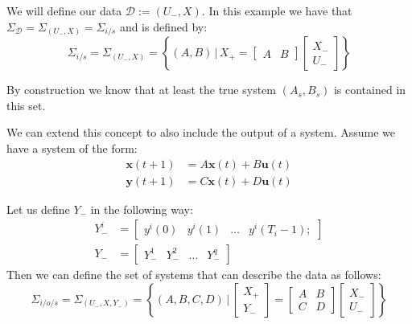 We will define our data $\mathcal{D} := (U_-, X)$. In this example we have that $\Sigma_\mathcal{D} = \Sigma_{(U_-,X)} = \Sigma_{i/s}$ and is defined by:
\begin{equation} \label{isSet}
	\Sigma_{i/s} = \Sigma_{(U_-,X)} = \left\{ (A, B) \, | \, X_{+} = \begin{bmatrix} A & B \end{bmatrix} \begin{bmatrix} X_{-} \\ U_{-} \end{bmatrix} \right\}
\end{equation}

By construction we know that at least the true system $(A_s,B_s)$ is contained in this set.

We can extend this concept to also include the output of a system. Assume we have a system of the form:
\begin{subequations}\label{isoSystem}
	\begin{align}
		\mathbf{x}(t+1) &= A \mathbf{x}(t) + B \mathbf{u}(t) \\
		\mathbf{y}(t+1) &= C \mathbf{x}(t) + D \mathbf{u}(t)
	\end{align}
\end{subequations}

Let us define $Y_-$ in the following way:
\begin{align*}
	Y_-^i &= \begin{bmatrix}	y^i(0) & y^i(1)& \dots & y^i(T_i-1); \end{bmatrix}\\
	Y_- &= \begin{bmatrix} Y_-^1 & Y_-^2 & \dots & Y_-^q	\end{bmatrix}
\end{align*}
Then we can define the set of systems that can describe the data as follows:
\begin{equation}
\label{isoSet} 
\Sigma_{i/o/s} = 
\Sigma_{(U_-,X, Y_-)} = \left\{ (A, B, C, D) \, | \, 
\begin{bmatrix} X_{+} \\ Y_{-} \end{bmatrix} = 
\begin{bmatrix} A & B \\ C & D \end{bmatrix} 
\begin{bmatrix} X_{-} \\ U_{-} \end{bmatrix} \right\} 
\end{equation}


